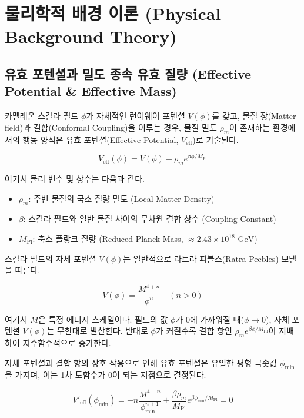 \documentclass[11pt, a4paper]{article}
\begin{document}
\section{물리학적 배경 이론 (Physical Background Theory)}

\subsection{유효 포텐셜과 밀도 종속 유효 질량 (Effective Potential \& Effective Mass)}
카멜레온 스칼라 필드 $\phi$가 자체적인 런어웨이 포텐셜 $V(\phi)$를 갖고, 물질 장(Matter field)과 결합(Conformal Coupling)을 이루는 경우, 물질 밀도 $\rho_m$이 존재하는 환경에서의 행동 양식은 유효 포텐셜(Effective Potential, $V_{\text{eff}}$)로 기술된다.

\begin{equation}
    V_{\text{eff}}(\phi) = V(\phi) + \rho_m e^{\beta \phi / M_{\text{Pl}}}
\end{equation}

여기서 물리 변수 및 상수는 다음과 같다.
\begin{itemize}
    \item $\rho_m$: 주변 물질의 국소 질량 밀도 (Local Matter Density)
    \item $\beta$: 스칼라 필드와 일반 물질 사이의 무차원 결합 상수 (Coupling Constant)
    \item $M_{\text{Pl}}$: 축소 플랑크 질량 (Reduced Planck Mass, $\approx 2.43 \times 10^{18} \text{ GeV}$)
\end{itemize}

스칼라 필드의 자체 포텐셜 $V(\phi)$는 일반적으로 라트라-피블스(Ratra-Peebles) 모델을 따른다.

\begin{equation}
    V(\phi) = \frac{M^{4+n}}{\phi^n} \quad (n > 0)
\end{equation}

여기서 $M$은 특정 에너지 스케일이다. 필드의 값 $\phi$가 0에 가까워질 때($\phi \to 0$), 자체 포텐셜 $V(\phi)$는 무한대로 발산한다. 반대로 $\phi$가 커질수록 결합 항인 $\rho_m e^{\beta \phi / M_{\text{Pl}}}$이 지배하여 지수함수적으로 증가한다.

자체 포텐셜과 결합 항의 상호 작용으로 인해 유효 포텐셜은 유일한 평형 극솟값 $\phi_{\text{min}}$을 가지며, 이는 1차 도함수가 0이 되는 지점으로 결정된다.

\begin{equation}
    V'_{\text{eff}}(\phi_{\text{min}}) = -n \frac{M^{4+n}}{\phi_{\text{min}}^{n+1}} + \frac{\beta \rho_m}{M_{\text{Pl}}} e^{\beta \phi_{\text{min}} / M_{\text{Pl}}} = 0
\end{equation}
\end{document}
